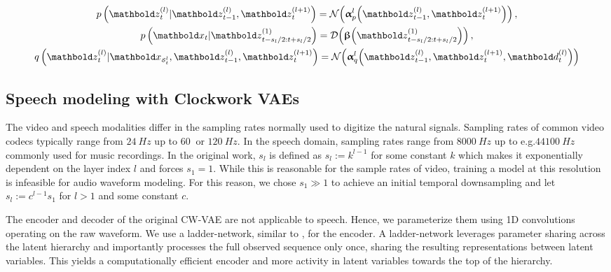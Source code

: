 \begin{gather}
    p\left(\zb_t^{(l)}|\zb_{t-1}^{(l)},\zb_{t}^{(l+1)}\right) = \mathcal{N}\pa{\alphab_{p}^{l}\pa{\zb_{t-1}^{(l)},\zb_t^{(l+1)}}} \, , \\ \nonumber
    p\left(\xb_t|\zb^{(1)}_{t-s_l/2:t+s_l/2}\right) = \mathcal{D}\pa{\betab\pa{\zb^{(1)}_{t-s_l/2:t+s_l/2}}} \, , \\
    q\left(\zb_t^{(l)}|\xb_{\scriptscriptstyle\mathcal{S}_t^l},\zb_{t-1}^{(l)},\zb_t^{(l+1)}\right) = \mathcal{N}\pa{\alphab_{q}^{l}\pa{\zb_{t-1}^{(l)},\zb_{t}^{(l+1)},\db_t^{(l)}}} \nonumber
\end{gather}


\subsection{Speech modeling with Clockwork VAEs} \label{sec: cwvae on speech}
The video and speech modalities differ in the sampling rates normally used to digitize the natural signals. Sampling rates of common video codecs typically range from $\SI{24}{Hz}$ up to $\SI{60}{}$ or $\SI{120}{Hz}$. In the speech domain, sampling rates range from $\SI{8000}{Hz}$ up to e.g.\@ $\SI{44100}{Hz}$ commonly used for music recordings. In the original work, $s_l$ is defined as $s_l:= k^{l-1}$ for some constant $k$ which makes it exponentially dependent on the layer index $l$ and forces $s_1 = 1$. While this is reasonable for the sample rates of video, training a model at this resolution is infeasible for audio waveform modeling. For this reason, we chose $s_1 \gg 1$ to achieve an initial temporal downsampling and let $s_l:= c^{l-1}s_1$ for $l>1$ and some constant $c$.

The encoder and decoder of the original CW-VAE are not applicable to speech. Hence, we parameterize them using 1D convolutions operating on the raw waveform. We use a ladder-network, similar to \textcite{sonderby_ladder_2016, aksan_stcn_2019}, for the encoder. A ladder-network leverages parameter sharing across the latent hierarchy and importantly processes the full observed sequence only once, sharing the resulting representations between latent variables. This yields a computationally efficient encoder and more activity in latent variables towards the top of the hierarchy.


